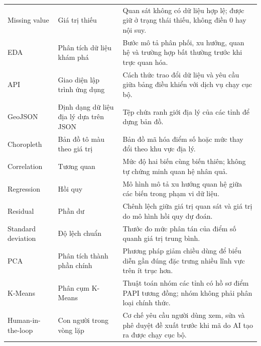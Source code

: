 \begin{longtable}{@{}p{}p{}p{}@{}}
Missing value & Giá trị thiếu & Quan sát không có dữ liệu hợp lệ; được giữ ở trạng thái thiếu, không điền 0 hay nội suy. \\
EDA & Phân tích dữ liệu khám phá & Bước mô tả phân phối, xu hướng, quan hệ và trường hợp bất thường trước khi trực quan hóa. \\
API & Giao diện lập trình ứng dụng & Cách thức trao đổi dữ liệu và yêu cầu giữa bảng điều khiển với dịch vụ chạy cục bộ. \\
GeoJSON & Định dạng dữ liệu địa lý dựa trên JSON & Tệp chứa ranh giới địa lý của các tỉnh để dựng bản đồ. \\
Choropleth & Bản đồ tô màu theo giá trị & Bản đồ mã hóa điểm số hoặc mức thay đổi theo khu vực địa lý. \\
Correlation & Tương quan & Mức độ hai biến cùng biến thiên; không tự chứng minh quan hệ nhân quả. \\
Regression & Hồi quy & Mô hình mô tả xu hướng quan hệ giữa các biến trong phạm vi dữ liệu. \\
Residual & Phần dư & Chênh lệch giữa giá trị quan sát và giá trị do mô hình hồi quy dự đoán. \\
Standard deviation & Độ lệch chuẩn & Thước đo mức phân tán của điểm số quanh giá trị trung bình. \\
PCA & Phân tích thành phần chính & Phương pháp giảm chiều dùng để biểu diễn gần đúng đặc trưng nhiều lĩnh vực trên ít trục hơn. \\
K-Means & Phân cụm K-Means & Thuật toán nhóm các tỉnh có hồ sơ điểm PAPI tương đồng; nhóm không phải phân loại chính thức. \\
Human-in-the-loop & Con người trong vòng lặp & Cơ chế yêu cầu người dùng xem, sửa và phê duyệt đề xuất trước khi mã do AI tạo ra được chạy cục bộ. \\
\bottomrule
\end{longtable}
\normalsize
